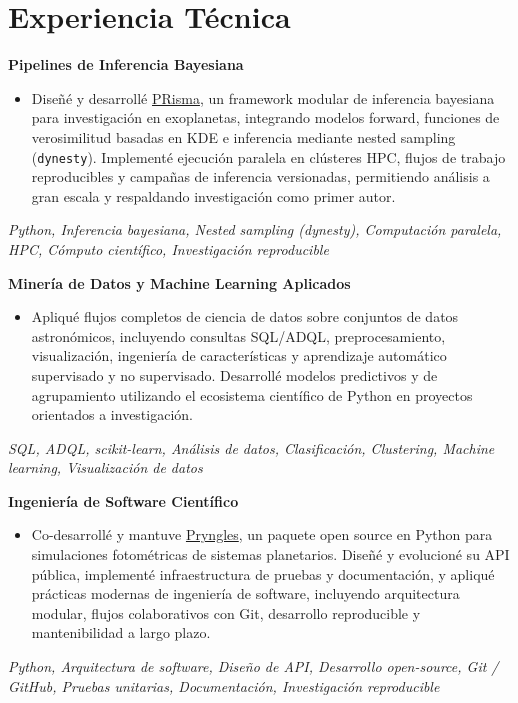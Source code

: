 \section*{Experiencia Técnica}

\textbf{Pipelines de Inferencia Bayesiana}
\begin{itemize}
    \item Diseñé y desarrollé \href{https://github.com/seap-udea/PRisma}{PRisma}, un framework modular de inferencia bayesiana para investigación en exoplanetas, integrando modelos forward, funciones de verosimilitud basadas en KDE e inferencia mediante nested sampling (\texttt{dynesty}). Implementé ejecución paralela en clústeres HPC, flujos de trabajo reproducibles y campañas de inferencia versionadas, permitiendo análisis a gran escala y respaldando investigación como primer autor.
\end{itemize}
\textit{Python, Inferencia bayesiana, Nested sampling (dynesty), Computación paralela, HPC, Cómputo científico, Investigación reproducible}

\vspace{6pt}
\textbf{Minería de Datos y Machine Learning Aplicados}
\begin{itemize}
    \item Apliqué flujos completos de ciencia de datos sobre conjuntos de datos astronómicos, incluyendo consultas SQL/ADQL, preprocesamiento, visualización, ingeniería de características y aprendizaje automático supervisado y no supervisado. Desarrollé modelos predictivos y de agrupamiento utilizando el ecosistema científico de Python en proyectos orientados a investigación.
\end{itemize}
\textit{SQL, ADQL, scikit-learn, Análisis de datos, Clasificación, Clustering, Machine learning, Visualización de datos}

\vspace{6pt}
\textbf{Ingeniería de Software Científico}
\begin{itemize}
    \item Co-desarrollé y mantuve \href{https://github.com/seap-udea/pryngles}{Pryngles}, un paquete open source en Python para simulaciones fotométricas de sistemas planetarios. Diseñé y evolucioné su API pública, implementé infraestructura de pruebas y documentación, y apliqué prácticas modernas de ingeniería de software, incluyendo arquitectura modular, flujos colaborativos con Git, desarrollo reproducible y mantenibilidad a largo plazo.
\end{itemize}
\textit{Python, Arquitectura de software, Diseño de API, Desarrollo open-source, Git / GitHub, Pruebas unitarias, Documentación, Investigación reproducible}
